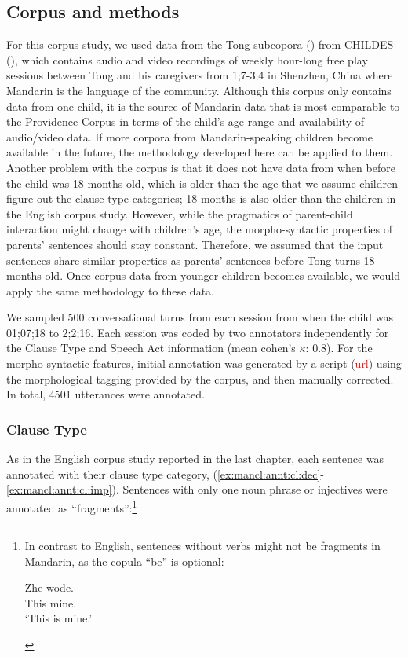 \subsection{Corpus and methods}
\label{sec:mancl:corpus:method}
For this corpus study, we used data from the Tong subcopora (\cite{TongCorpus}) from CHILDES (\cite{CHILDES}), which contains audio and video recordings of weekly hour-long free play sessions between Tong and his caregivers from 1;7-3;4 in Shenzhen, China where Mandarin is the language of the community. Although this corpus only contains data from one child, it is the source of Mandarin data that is most comparable to the Providence Corpus in terms of the child's age range and availability of audio/video data. If more corpora from Mandarin-speaking children become available in the future, the methodology developed here can be applied to them. Another problem with the corpus is that it does not have data from when before the child was 18 months old, which is older than the age that we assume children figure out the clause type categories; 18 months is also older than the children in the English corpus study. However, while the pragmatics of parent-child interaction might change with children's age, the morpho-syntactic properties of parents' sentences should stay constant. Therefore, we assumed that the input sentences share similar properties as parents' sentences before Tong turns 18 months old. Once corpus data from younger children becomes available, we would apply the same methodology to these data. 

We sampled 500 conversational turns from each session from when the child was 01;07;18 to 2;2;16. Each session was coded by two annotators independently for the Clause Type and Speech Act information (mean cohen's $\kappa$: 0.8). For the morpho-syntactic features, initial annotation was generated by a script (\textcolor{red}{url}) using the morphological tagging provided by the corpus, and then manually corrected. In total, 4501 utterances were annotated. 

\subsubsection{Clause Type}

As in the English corpus study reported in the last chapter, each sentence was annotated with their clause type category, \diis{} (\ref{ex:mancl:annt:cl:dec}-\ref{ex:mancl:annt:cl:imp}). Sentences with only one noun phrase or injectives were annotated as ``fragments'':\footnote{In contrast to English, sentences without verbs might not be fragments in Mandarin, as the copula  ``be'' is optional:
\begin{xlist}
\ex 
\gll Zhe wode.\\
This mine.\\
\trans `This is mine.'
\end{xlist}
}

